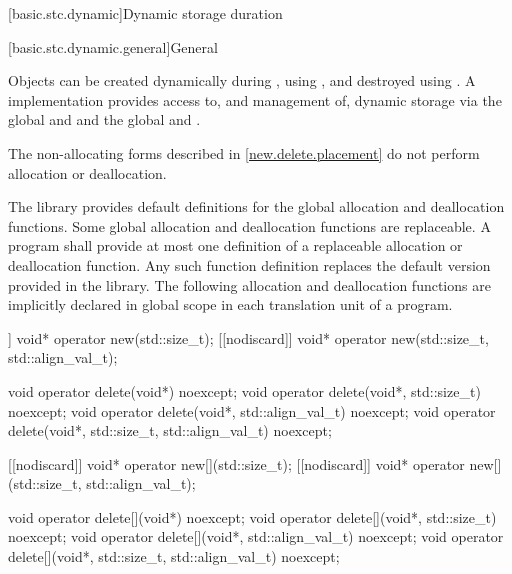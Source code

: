 [basic.stc.dynamic]{Dynamic storage duration}%

[basic.stc.dynamic.general]{General}%

\pnum
Objects can be created dynamically during , using
%
, and destroyed using
%
. A \Cpp{} implementation
provides access to, and management of, dynamic storage via the global
  and  and the global   and .
\begin{note}
The non-allocating forms described in \ref{new.delete.placement}
do not perform allocation or deallocation.
\end{note}

\pnum
The library provides default definitions for the global allocation and
deallocation functions. Some global allocation and deallocation
functions are replaceable. A \Cpp{} program shall
provide at most one definition of a replaceable allocation or
deallocation function. Any such function definition replaces the default
version provided in the library. The
following allocation and deallocation functions
are implicitly declared in global scope in each translation unit of a
program.

\begin{codeblock}
[[nodiscard]] void* operator new(std::size_t);
[[nodiscard]] void* operator new(std::size_t, std::align_val_t);

void operator delete(void*) noexcept;
void operator delete(void*, std::size_t) noexcept;
void operator delete(void*, std::align_val_t) noexcept;
void operator delete(void*, std::size_t, std::align_val_t) noexcept;

[[nodiscard]] void* operator new[](std::size_t);
[[nodiscard]] void* operator new[](std::size_t, std::align_val_t);

void operator delete[](void*) noexcept;
void operator delete[](void*, std::size_t) noexcept;
void operator delete[](void*, std::align_val_t) noexcept;
void operator delete[](void*, std::size_t, std::align_val_t) noexcept;
\end{codeblock}

